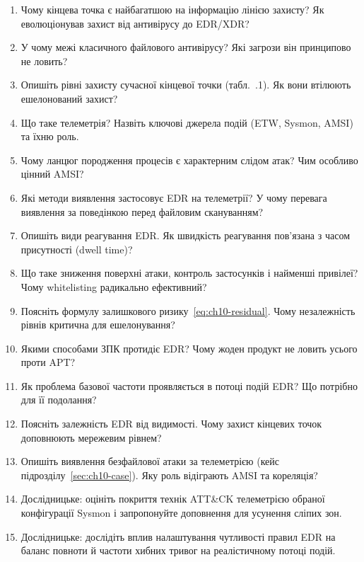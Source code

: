 \selfcheck
\begin{enumerate}
\item Чому кінцева точка є найбагатшою на інформацію лінією захисту? Як еволюціонував захист від антивірусу до EDR/XDR?
\item У чому межі класичного файлового антивірусу? Які загрози він принципово не ловить?
\item Опишіть рівні захисту сучасної кінцевої точки (табл.~\thechapter.1). Як вони втілюють ешелонований захист?
\item Що таке телеметрія? Назвіть ключові джерела подій (ETW, Sysmon, AMSI) та їхню роль.
\item Чому ланцюг породження процесів є характерним слідом атак? Чим особливо цінний AMSI?
\item Які методи виявлення застосовує EDR на телеметрії? У чому перевага виявлення за поведінкою перед файловим скануванням?
\item Опишіть види реагування EDR. Як швидкість реагування пов'язана з часом присутності (dwell time)?
\item Що таке зниження поверхні атаки, контроль застосунків і найменші привілеї? Чому whitelisting радикально ефективний?
\item Поясніть формулу залишкового ризику~\eqref{eq:ch10-residual}. Чому незалежність рівнів критична для ешелонування?
\item Якими способами ЗПК протидіє EDR? Чому жоден продукт не ловить усього проти APT?
\item Як проблема базової частоти проявляється в потоці подій EDR? Що потрібно для її подолання?
\item Поясніть залежність EDR від видимості. Чому захист кінцевих точок доповнюють мережевим рівнем?
\item Опишіть виявлення безфайлової атаки за телеметрією (кейс підрозділу~\ref{sec:ch10-case}). Яку роль відіграють AMSI та кореляція?
\item Дослідницьке: оцініть покриття технік ATT\&CK телеметрією обраної конфігурації Sysmon і запропонуйте доповнення для усунення сліпих зон.
\item Дослідницьке: дослідіть вплив налаштування чутливості правил EDR на баланс повноти й частоти хибних тривог на реалістичному потоці подій.
\end{enumerate}
